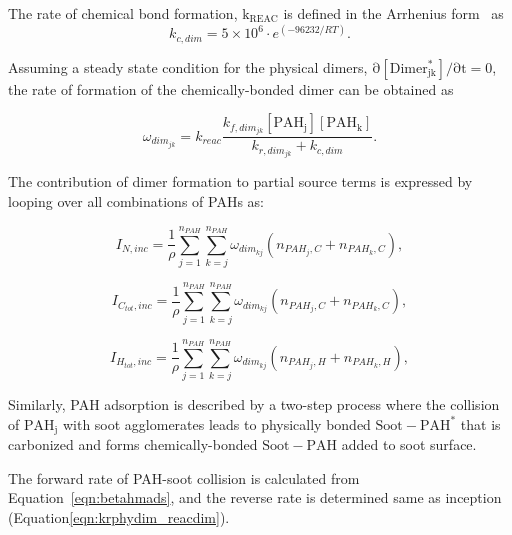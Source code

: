 The rate of chemical bond formation, $\mathrm{k_{REAC}}$ is defined in the Arrhenius form~\cite{naseri2022simulating} as
\begin{equation}
	k_{c,dim} = 5\times10^6\cdot e^{(-96232/RT)}
	\label{eqn:kc_reacdim}.
\end{equation}

Assuming a steady state condition for the physical dimers, $\mathrm{\partial [Dimer^*_{jk}]/\partial t=0}$, the rate of formation of the chemically-bonded dimer can be obtained as

\begin{equation}
	\omega_{dim_{jk}} = k_{reac}\frac{k_{f,dim_{jk}}[\mathrm{PAH_j}][\mathrm{PAH_k}]}
	{k_{r,dim_{jk}}+k_{c,dim}}
	\label{eqn:chemdimer_reacdim}.
\end{equation}

The contribution of dimer formation to partial source terms is expressed by looping over all combinations of PAHs as:

\begin{equation}
	I_{N,{inc}} = 
	\frac{1}{\rho}
	\sum_{j=1}^{n_{PAH}} \sum_{k=j}^{n_{PAH}}  \omega_{dim_{kj}} 
	\left(
	n_{PAH_j,C}+n_{PAH_k,C}
	\right)
	\label{eqn:IN_inc},
\end{equation}

\begin{equation}
	I_{C_{tot},{inc}} = 
	\frac{1}{\rho}
	\sum_{j=1}^{n_{PAH}} \sum_{k=j}^{n_{PAH}}  \omega_{dim_{kj}} 
	\left(
	n_{PAH_j,C}+n_{PAH_k,C}
	\right)
	\label{eqn:ICtot_inc},
\end{equation}

\begin{equation}
	I_{H_{tot},{inc}} = 
	\frac{1}{\rho}
	\sum_{j=1}^{n_{PAH}} \sum_{k=j}^{n_{PAH}}  \omega_{dim_{kj}} 
	\left(
	n_{PAH_j,H}+n_{PAH_k,H}
	\right)
	\label{eqn:IHtot_inc},
\end{equation}

Similarly, PAH adsorption is described by a two-step process where the collision of $\mathrm{PAH_j}$ with soot agglomerates leads to physically bonded $\mathrm{Soot-PAH^*}$ that is carbonized and forms chemically-bonded $\mathrm{Soot-PAH}$ added to soot surface.



The forward rate of PAH-soot collision is calculated from Equation~\eqref{eqn:betahmads}, and the reverse rate is determined same as inception (Equation\eqref{eqn:krphydim_reacdim}).

